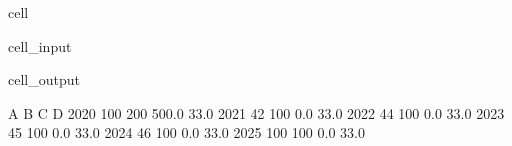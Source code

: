 \documentclass[letterpaper,10pt,english]{jupyterBook}
\begin{document}
\begin{sphinxuseclass}{cell}\begin{sphinxVerbatimInput}

\begin{sphinxuseclass}{cell_input}
\begin{sphinxVerbatim}[commandchars=\\\{\}]
\end{sphinxVerbatim}

\end{sphinxuseclass}\end{sphinxVerbatimInput}
\begin{sphinxVerbatimOutput}

\begin{sphinxuseclass}{cell_output}
\begin{sphinxVerbatim}[commandchars=\\\{\}]
        A    B      C     D
2020  100  200  500.0  33.0
2021   42  100    0.0  33.0
2022   44  100    0.0  33.0
2023   45  100    0.0  33.0
2024   46  100    0.0  33.0
2025  100  100    0.0  33.0
\end{sphinxVerbatim}

\end{sphinxuseclass}\end{sphinxVerbatimOutput}

\end{sphinxuseclass}
\end{document}
